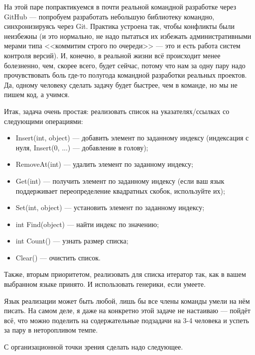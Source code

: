 \documentclass{../../text-style}
\begin{document}
\maketitle
\thispagestyle{empty}

На этой паре попрактикуемся в почти реальной командной разработке через GitHub --- попробуем разработать небольшую библиотеку командно, синхронизируясь через Git. Практика устроена так, чтобы конфликты были неизбежны (и это нормально, не надо пытаться их избежать административными мерами типа <<коммитим строго по очереди>> --- это и есть работа систем контроля версий). И, конечно, в реальной жизни всё происходит менее болезненно, чем, скорее всего, будет сейчас, потому что нам за одну пару надо прочувствовать боль где-то полугода командной разработки реальных проектов. Да, одному человеку сделать задачу будет быстрее, чем в команде, но мы не пишем код, а учимся.

Итак, задача очень простая: реализовать список на указателях/ссылках со следующими операциями:
\begin{itemize}
    \item Insert(int, object) --- добавить элемент по заданному индексу (индексация с нуля, Insert(0, ...) --- добавление в голову);
    \item RemoveAt(int) --- удалить элемент по заданному индексу;
    \item Get(int) --- получить элемент по заданному индексу (если ваш язык поддерживает переопределение квадратных скобок, используйте их);
    \item Set(int, object) --- установить элемент по заданному индексу;
    \item int Find(object) --- найти индекс по значению;
    \item int Count() --- узнать размер списка;
    \item Clear() --- очистить список.
\end{itemize}

Также, вторым приоритетом, реализовать для списка итератор так, как в вашем выбранном языке принято. И использовать генерики, если умеете.

Язык реализации может быть любой, лишь бы все члены команды умели на нём писать. На самом деле, я даже на конкретно этой задаче не настаиваю --- пойдёт всё, что можно поделить на содержательные подзадачи на 3-4 человека и успеть за пару в неторопливом темпе.

С организационной точки зрения сделать надо следующее.
\end{document}
